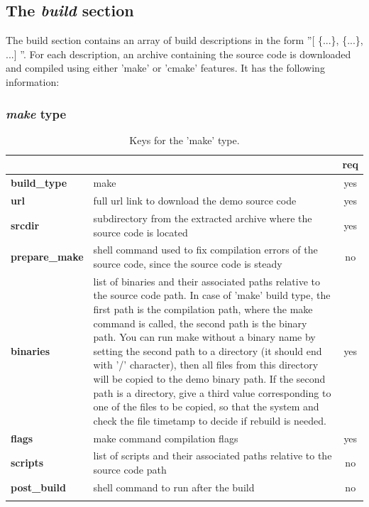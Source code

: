 \subsection{The \emph{build} section}

The build section contains an array of build descriptions in the form
''[ \{...\}, \{...\}, ...] ''. For each description, an archive containing the 
source code is downloaded and compiled using either 'make' or 'cmake' features.
It has the following information:

\subsubsection{\emph{make} type}

\begin{longtable}{|>{\bf}L{\linewidth}|L{\linewidth}|c|}
\hline
{}     &  & {\bf req} \tabularnewline 
\hline \hline
 build\_type    & make & yes \\ \hline
 url        & full url link to download the demo source code & yes \\ \hline
 srcdir     & subdirectory from the extracted archive where the source code is 
            located & yes \\ \hline
 prepare\_make & shell command used to fix compilation errors of the source code,
                since the source code is steady & no  \\ \hline
 binaries   & list of binaries and their associated paths relative to the source 
            code path. In case of 'make' build type, the first path is the compilation
            path, where the make command is called, the second path is the binary
            path. You can run make without a binary name by setting the second
            path to a directory (it should end with '/' character), then all files 
            from this directory will be copied
            to the demo binary path. If the second path is a directory, give 
            a third value corresponding to one of the files to be copied, so that
            the system and check the file timetamp to decide if rebuild is needed.
            & yes \\ \hline
 flags      & make command compilation flags & yes \\ \hline
 scripts    & list of scripts and their associated paths relative to the source 
            code path & no  \\ \hline
 post\_build & shell command to run after the build & no \\ \hline
\caption{Keys for the 'make' type.}
\end{longtable}

